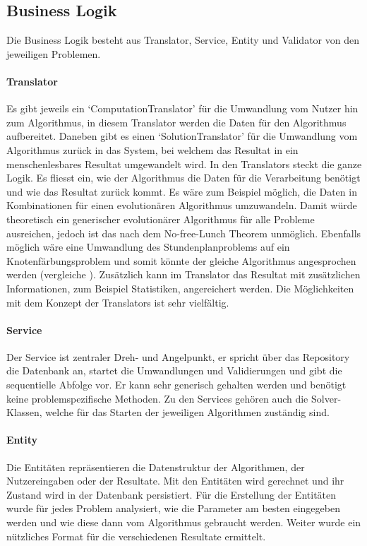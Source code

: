 \subsection{Business Logik}
Die Business Logik besteht aus Translator, Service, Entity und Validator von den jeweiligen Problemen. 
\paragraph{Translator}
Es gibt jeweils ein `ComputationTranslator' für die Umwandlung vom Nutzer hin zum Algorithmus, in diesem Translator werden die Daten für den Algorithmus aufbereitet. Daneben gibt es einen 
`SolutionTranslator' für die Umwandlung vom Algorithmus zurück in das System, bei welchem das Resultat in ein menschenlesbares Resultat umgewandelt wird. In den Translators steckt die 
ganze Logik. Es fliesst ein, wie der Algorithmus die Daten für die Verarbeitung benötigt und wie das Resultat zurück kommt. Es wäre zum Beispiel möglich, die Daten in Kombinationen für einen 
evolutionären Algorithmus umzuwandeln. Damit würde theoretisch ein generischer evolutionärer Algorithmus für alle Probleme ausreichen, jedoch ist das nach dem No-free-Lunch Theorem 
\cite{no_free_lunch} unmöglich. Ebenfalls möglich wäre eine Umwandlung des Stundenplanproblems auf ein Knotenfärbungsproblem und somit könnte der gleiche Algorithmus angesprochen 
werden (vergleiche \cite{timetabling_abdullah}).  Zusätzlich kann im Translator das Resultat mit zusätzlichen Informationen, zum Beispiel Statistiken, angereichert werden. Die Möglichkeiten mit 
dem Konzept der Translators ist sehr vielfältig.
\paragraph{Service}
Der Service ist zentraler Dreh- und Angelpunkt, er spricht über das Repository die Datenbank an, startet die Umwandlungen und Validierungen und gibt die sequentielle Abfolge vor. Er kann 
sehr generisch gehalten werden und benötigt keine problemspezifische Methoden. Zu den Services gehören auch die Solver-Klassen, welche für das Starten der jeweiligen Algorithmen zuständig 
sind.
\paragraph{Entity}
Die Entitäten repräsentieren die Datenstruktur der Algorithmen, der Nutzereingaben oder der Resultate. Mit den Entitäten wird gerechnet und ihr Zustand wird in der Datenbank persistiert. 
Für die Erstellung der Entitäten wurde für jedes Problem analysiert, wie die Parameter am besten eingegeben werden und wie diese dann vom Algorithmus gebraucht werden. Weiter 
wurde ein nützliches Format für die verschiedenen Resultate ermittelt.
